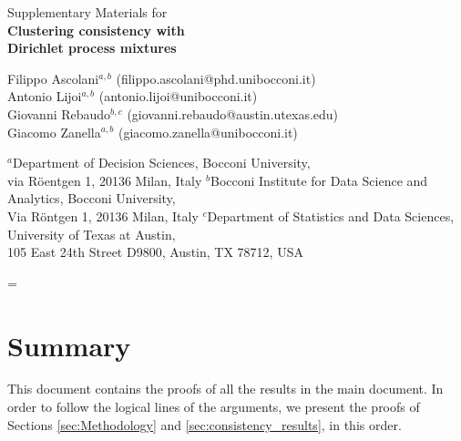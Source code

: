 \documentclass[12pt]{article}
\begin{document}
\newpage


\rhead{\bfseries\thepage}

\baselineskip 25pt
\begin{center}
{\LARGE{Supplementary Materials for\\} 
\bf  Clustering consistency with\\ Dirichlet process mixtures
}
\end{center}


\setcounter{equation}{0}
\setcounter{page}{1}
\setcounter{table}{1}
\setcounter{figure}{0}
\setcounter{Thm}{0}
\setcounter{Lem}{0}
\setcounter{Cor}{0}
\setcounter{Prop}{0}
\setcounter{section}{0}
\renewcommand{\theequation}{S.\arabic{equation}}
\renewcommand{\thesubsection}{S.\arabic{section}.\arabic{subsection}}
\renewcommand{\theThm}{S.\arabic{Thm}}
\renewcommand{\theCor}{S.\arabic{Cor}}
\renewcommand{\theProp}{S.\arabic{Prop}}
\renewcommand{\theLem}{S.\arabic{Lem}}
\renewcommand{\thesection}{S.\arabic{section}}
\renewcommand{\thepage}{S.\arabic{page}}
\renewcommand{\thetable}{S.\arabic{table}}
\renewcommand{\thefigure}{S.\arabic{figure}}

\vspace{0cm}

	\small
\baselineskip=14pt
	\begin{center}
		Filippo Ascolani$^{a,b}$ (filippo.ascolani@phd.unibocconi.it)\\
		Antonio Lijoi$^{a,b}$ (antonio.lijoi@unibocconi.it)\\
		Giovanni Rebaudo$^{b,c}$ (giovanni.rebaudo@austin.utexas.edu)\\
		Giacomo Zanella$^{a,b}$ (giacomo.zanella@unibocconi.it)
	
	\vskip 3mm
	$^{a}$Department of Decision Sciences, Bocconi University,\\
	via R\"oentgen 1, 20136 Milan, Italy
	\vskip 4pt 
	$^{b}$Bocconi Institute for Data Science and Analytics, Bocconi University,\\ 
	Via Röntgen 1, 20136 Milan, Italy
	\vskip 4pt 
	$^{c}$Department of Statistics and Data Sciences,
	University of Texas at Austin,\\
	105 East 24th Street D9800, Austin, TX 78712, USA\\	
\end{center}

\vskip 10mm
\baselineskip=\gnat

\section*{Summary}
This document contains the proofs of all the results in the main document. In order to follow the logical lines of the arguments, we present the proofs of Sections \ref{sec:Methodology} and \ref{sec:consistency_results}, in this order.
\end{document}
